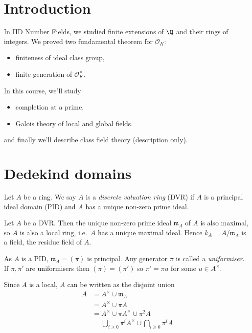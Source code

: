 \documentclass[a4paper]{article}
\renewcommand*{\O}{\mathcal{O}}
\begin{document}


\tableofcontents

\setcounter{section}{-1}

\section{Introduction}

In IID Number Fields, we studied finite extensions of \(\Q\) and their rings of integers. We proved two fundamental theorem for \(\O_K\):
\begin{itemize}
\item finiteness of ideal class group,
\item finite generation of \(\O_K^\times\).
\end{itemize}

In this course, we'll study
\begin{itemize}
\item completion at a prime,
\item Galois theory of local and global fields.
\end{itemize}
and finally we'll describe class field theory (description only).

\section{Dedekind domains}

\begin{definition}
  Let \(A\) be a ring. We say \(A\) is a \emph{discrete valuation ring} (DVR) if \(A\) is a principal ideal domain (PID) and \(A\) has a unique non-zero prime ideal.
\end{definition}

Let \(A\) be a DVR. Then the unique non-zero prime ideal \(\mathfrak m_A\) of \(A\) is also maximal, so \(A\) is also a local ring, i.e.\ \(A\) has a unique maximal ideal. Hence \(k_A = A/\mathfrak m_A\) is a field, the residue field of \(A\).

As \(A\) is a PID, \(\mathfrak m_A = (\pi)\) is principal. Any generator \(\pi\) is called a \emph{uniformiser}. If \(\pi, \pi'\) are uniformisers then \((\pi) = (\pi')\) so \(\pi' = \pi u\) for some \(u \in A^\times\).

Since \(A\) is a local, \(A\) can be written as the disjoint union
\begin{align*}
  A &= A^\times \cup \mathfrak m_A \\
    &= A^\times \cup \pi A \\
    &= A^\times \cup \pi A^\times \cup \pi^2 A \\
    &= \bigcup_{i \geq 0} \pi^i A^\times \cup \bigcap_{i \geq 0} \pi^i A
\end{align*}
\end{document}
